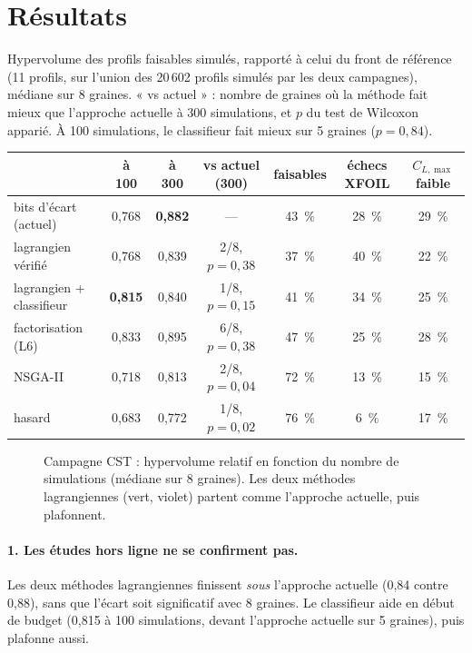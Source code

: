 \section{Résultats}
Hypervolume des profils faisables simulés, rapporté à celui du front de référence (11 profils, sur l'union des 20\,602 profils simulés par les deux campagnes), médiane sur 8 graines. « vs actuel » : nombre de graines où la méthode fait mieux que l'approche actuelle à 300 simulations, et $p$ du test de Wilcoxon apparié. À 100 simulations, le classifieur fait mieux sur 5 graines ($p=0{,}84$).
\begin{center}
\renewcommand{\arraystretch}{1.2}
\setlength{\tabcolsep}{4pt}
\small
\begin{tabular}{lcccccc}
\toprule
& à 100 & à 300 & vs actuel (300) & faisables & échecs XFOIL & $C_{L,\max}$ faible \\
\midrule
bits d'écart (actuel) & 0,768 & \textbf{0,882} & --- & 43~\% & 28~\% & 29~\% \\
lagrangien vérifié & 0,768 & 0,839 & 2/8, $p=0{,}38$ & 37~\% & 40~\% & 22~\% \\
lagrangien + classifieur & \textbf{0,815} & 0,840 & 1/8, $p=0{,}15$ & 41~\% & 34~\% & 25~\% \\
\midrule
factorisation (L6) & 0,833 & 0,895 & 6/8, $p=0{,}38$ & 47~\% & 25~\% & 28~\% \\
NSGA-II & 0,718 & 0,813 & 2/8, $p=0{,}04$ & 72~\% & 13~\% & 15~\% \\
hasard & 0,683 & 0,772 & 1/8, $p=0{,}02$ & 76~\% & 6~\% & 17~\% \\
\bottomrule
\end{tabular}
\end{center}

\begin{figure}[htbp]
\centering

\caption{Campagne CST : hypervolume relatif en fonction du nombre de simulations (médiane sur 8 graines). Les deux méthodes lagrangiennes (vert, violet) partent comme l'approche actuelle, puis plafonnent.}\label{fig:campagne-hv}
\end{figure}

\paragraph{1. Les études hors ligne ne se confirment pas.} Les deux méthodes lagrangiennes finissent \emph{sous} l'approche actuelle (0,84 contre 0,88), sans que l'écart soit significatif avec 8 graines. Le classifieur aide en début de budget (0,815 à 100 simulations, devant l'approche actuelle sur 5 graines), puis plafonne aussi.

